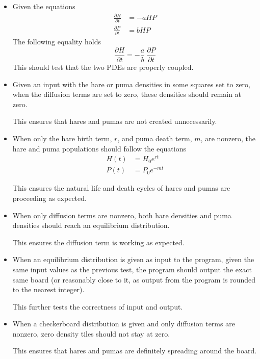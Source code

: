 \begin{itemize}
  \item Given the equations
    \begin{align*}
      \frac{\partial{H}}{\partial{t}} &= -aHP \\
      \frac{\partial{P}}{\partial{t}} &=  bHP
    \end{align*}
    The following equality holds
    \begin{equation*}
      \frac{\partial{H}}{\partial{t}}
        = -\frac{a}{b}\ \frac{\partial{P}}{\partial{t}}
    \end{equation*}
    This should test that the two PDEs are properly coupled.

  \item Given an input with the hare or puma densities in some squares
        set to zero, when the diffusion terms are set to zero, these
        densities should remain at zero.

        This ensures that hares and pumas are not created unnecessarily.

  \item When only the hare birth term, $r$, and puma death term, $m$, are
        nonzero, the hare and puma populations should follow the equations
        \begin{align*}
          H(t) &= H_0 e^{rt} \\
          P(t) &= P_0 e^{-mt}
        \end{align*}

        This ensures the natural life and death cycles of hares and pumas
        are proceeding as expected.

  \item When only diffusion terms are nonzero, both hare densities and puma
        densities should reach an equilibrium distribution.

        This ensures the diffusion term is working as expected.

  \item When an equilibrium distribution is given as input to the program,
        given the same input values as the previous test, the program should
        output the exact same board (or reasonably close to it, as output
        from the program is rounded to the nearest integer).

        This further tests the correctness of input and output.

  \item When a checkerboard distribution is given and only diffusion terms
        are nonzero, zero density tiles should not stay at zero.

        This ensures that hares and pumas are definitely spreading around
        the board.
\end{itemize}


